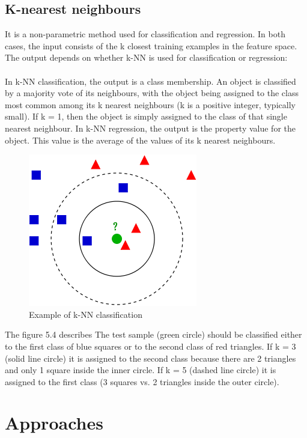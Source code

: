 \documentclass[paper=a4, fontsize=12pt]{scrartcl}
\numberwithin{equation}{section}		%
\numberwithin{figure}{section}			%
\numberwithin{table}{section}				%
\begin{document}
\subsection{K-nearest neighbours}
It is a non-parametric method used for classification and regression. In both cases, the input consists of the k closest training examples in the feature space. The output depends on whether k-NN is used for classification or regression:
\\
\\
In k-NN classification, the output is a class membership. An object is classified by a majority vote of its neighbours, with the object being assigned to the class most common among its k nearest neighbours (k is a positive integer, typically small). If k = 1, then the object is simply assigned to the class of that single nearest neighbour.
In k-NN regression, the output is the property value for the object. This value is the average of the values of its k nearest neighbours.
\begin{figure}[H]

\begin{center}

\includegraphics[scale=.6]{knn.png}

 \end{center}

  \caption{Example of k-NN classification}

  \label{fig:}
\end{figure}
The figure 5.4 describes The test sample (green circle) should be classified either to the first class of blue squares or to the second class of red triangles. If k = 3 (solid line circle) it is assigned to the second class because there are 2 triangles and only 1 square inside the inner circle. If k = 5 (dashed line circle) it is assigned to the first class (3 squares vs. 2 triangles inside the outer circle).
\section{Approaches}
\end{document}
